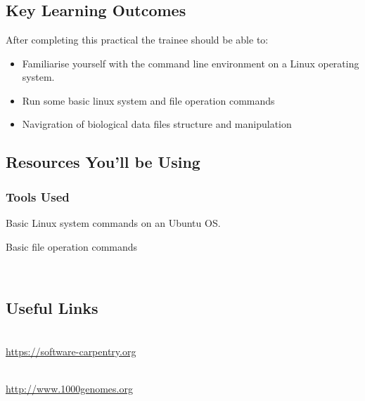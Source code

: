 




\chapter{\moduleTitle}
\newpage

\section{Key Learning Outcomes}

After completing this practical the trainee should be able to:
\begin{itemize}
  \item Familiarise yourself with the command line environment on a Linux operating system.
  \item Run some basic linux system and file operation commands
  \item Navigration of biological data files structure and manipulation
\end{itemize}

\section{Resources You'll be Using}
 
\subsection{Tools Used}
\begin{description}[style=multiline,labelindent=0cm,align=left,leftmargin=0.5cm]
  \item Basic Linux system commands on an Ubuntu OS.
 \item Basic file operation commands 
\end{description}\

\section{Useful Links}
 
\begin{description}[style=multiline,labelindent=0cm,align=left,leftmargin=0.5cm]
  \item [Software Carpentry]\hfill\\
    \url{https://software-carpentry.org}
  \item [1000Genome Project data for example]\hfill\\
    \url{http://www.1000genomes.org}
\end{description}


